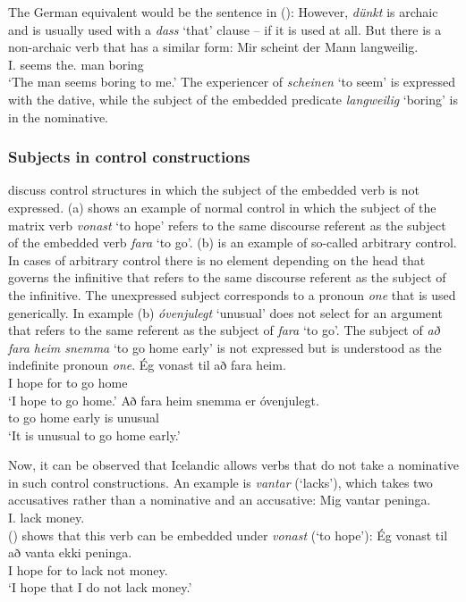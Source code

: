 The German equivalent would be the sentence in ():
\z
However, \emph{dünkt} is archaic and is usually used with a \emph{dass} `that' clause -- if it is used at
all. But there is a non-archaic verb that has a similar form:
\ea
\gll Mir scheint der Mann langweilig.\\
     I.\DAT{} seems the.\NOM{} man boring\\\german
\glt `The man seems boring to me.'
\z
The experiencer of \emph{scheinen} `to seem' is expressed with the dative, while the subject of the
embedded predicate \emph{langweilig} `boring' is in the nominative.



\subsubsection{Subjects in control constructions}
\label{sec-subject-control}

\citet*[Section~2.7]{ZMT85a} discuss control structures in which the subject of the embedded verb is
not expressed. (a) shows an example of normal control in which the subject of the matrix verb
\emph{vonast} `to hope' refers to the same discourse referent as the subject of the embedded verb \emph{fara} `to
go'. (b) is an example of so-called arbitrary control. In cases of arbitrary control there is
no element depending on the head that governs the infinitive that refers to the same discourse
referent as the subject of the infinitive. The unexpressed subject corresponds to a pronoun \emph{one} that is
used generically. In example (b) \emph{óvenjulegt} `unusual' does not select for an argument
that refers to the same referent as the subject of \emph{fara} `to go'. The subject of \emph{að fara
  heim snemma} `to go home early' is not expressed but is understood as the indefinite pronoun \emph{one}.
\eal
\ex
\gll Ég  vonast til að fara heim.\\
     I   hope   for to go   home\\\icelandic
\glt `I hope to go home.'
\ex
\gll Að fara heim snemma er óvenjulegt.\\
     to go home   early is unusual\\
\glt `It is unusual to go home early.'
\zl

Now, it can be observed that Icelandic allows verbs that do not take a nominative in such control
constructions. An example is \emph{vantar} (`lacks'), which takes two accusatives rather than a
nominative and an accusative:
\ea
\gll Mig      vantar peninga.\\
     I.\ACC{} lack   money.\ACC\\\icelandic
\z
() shows that this verb can be embedded under \emph{vonast} (`to hope'):
\ea
\gll Ég vonast til að vanta ekki peninga.\\
     I  hope   for to lack  not  money.\ACC\\\icelandic
\glt `I hope that I do not lack money.'
\z

